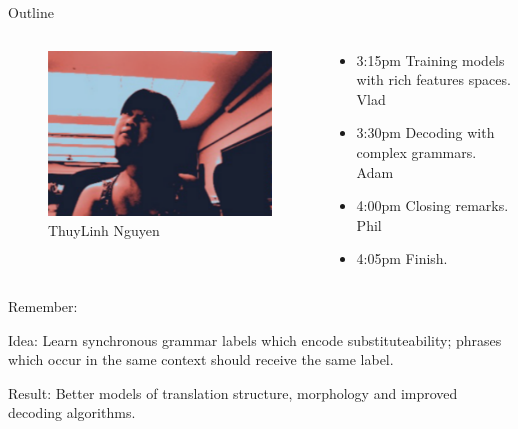 \documentclass{beamer}
\newenvironment{unpacked_itemize}{
\begin{itemize}
  \setlength{\itemsep}{10pt}
  \setlength{\parskip}{0pt}
  \setlength{\parsep}{0pt}
}{\end{itemize}}
\begin{document}
\begin{frame}[t]{Outline}
\begin{columns}
\begin{column}{0.2\textwidth}
\begin{exampleblock}{}
\begin{figure}
        {\centering \includegraphics[scale=0.15]{linh.pdf}} \\
        ThuyLinh Nguyen\\

      \end{figure}
    \end{exampleblock}
  \end{column}
  \begin{column}{0.7\textwidth}
    \begin{itemize}
    \setlength{\itemsep}{25pt}
    \setlength{\parskip}{0pt}
    \setlength{\parsep}{0pt}
    \item 3:15pm Training models with rich features spaces. Vlad
    \item 3:30pm Decoding with complex grammars. Adam
    \item 4:00pm Closing remarks. Phil
    \item 4:05pm Finish.
    \end{itemize}
  \end{column}
\end{columns}
\end{frame}



\begin{frame}[t]{Remember:}
  \vspace{0.5in}
  \begin{unpacked_itemize}
    \item Idea: Learn synchronous grammar labels which encode substituteability; phrases which occur in the same context should receive the same label.
    \item Result: Better models of translation structure, morphology and improved decoding algorithms.
  \end{unpacked_itemize}
\end{frame}
\end{document}
